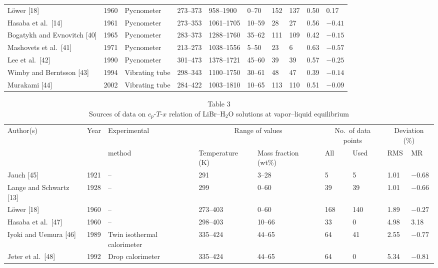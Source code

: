 \documentclass[11pt]{article}
\newcommand{\wtpc}{wt\%}
\begin{document}
\begin{landscape}
\begin{longtable}{llllllllll}
L\"ower [18]                    & 1960 & Pycnometer     & 273--373 & 958--1900  & 0--70   & 152 & 137 & 0.50 & 0.17 \\
Hasaba et al.\ [14]             & 1961 & Pycnometer     & 273--353 & 1061--1705 & 10--59  & 28  & 27  & 0.56 & $-0.41$ \\
Bogatykh and Evnovitch [40]     & 1965 & Pycnometer     & 283--373 & 1288--1760 & 35--62  & 111 & 109 & 0.42 & $-0.15$ \\
Mashovets et al.\ [41]          & 1971 & Pycnometer     & 213--273 & 1038--1556 & 5--50   & 23  & 6   & 0.63 & $-0.57$ \\
Lee et al.\ [42]                & 1990 & Pycnometer     & 301--473 & 1378--1721 & 45--60  & 39  & 39  & 0.57 & $-0.25$ \\
Wimby and Berntsson [43]        & 1994 & Vibrating tube & 298--343 & 1100--1750 & 30--61  & 48  & 47  & 0.39 & $-0.14$ \\
Murakami [44]                   & 2002 & Vibrating tube & 284--422 & 1003--1810 & 10--65  & 113 & 110 & 0.51 & $-0.09$ \\
\bottomrule
\end{longtable}
\end{landscape}

\begin{table}[htbp]
\centering
\scriptsize
\caption*{Table 3\\ Sources of data on $c_p$-$T$-$x$ relation of
          LiBr--H$_2$O solutions at vapor--liquid equilibrium}
\setlength{\tabcolsep}{3pt}
\begin{tabular}{lllllllll}
\toprule
Author(s) & Year & Experimental
 & \multicolumn{2}{c}{Range of values}
 & \multicolumn{2}{c}{No.\ of data points}
 & \multicolumn{2}{c}{Deviation (\%)} \\
\cmidrule(lr){4-5}\cmidrule(lr){6-7}\cmidrule(lr){8-9}
 & & method & Temperature (K) & Mass fraction (\wtpc)
 & All & Used & RMS & MR \\
\midrule
Jauch [45]                 & 1921 & --  & 291      & 3--28  & 5   & 5   & 1.01 & $-0.68$ \\
Lange and Schwartz [13]    & 1928 & --  & 299      & 0--60  & 39  & 39  & 1.01 & $-0.66$ \\
L\"ower [18]               & 1960 & --  & 273--403 & 0--60  & 168 & 140 & 1.89 & $-0.27$ \\
Hasaba et al.\ [47]        & 1960 & --  & 298--403 & 10--66 & 33  & 0   & 4.98 & 3.18 \\
Iyoki and Uemura [46]      & 1989 & Twin isothermal calorimeter
                                        & 335--424 & 44--65 & 64  & 41  & 2.55 & $-0.77$ \\
Jeter et al.\ [48]         & 1992 & Drop calorimeter
                                        & 335--424 & 44--65 & 64  & 0   & 5.34 & $-0.81$ \\
\bottomrule
\end{tabular}
\end{table}
\end{document}
